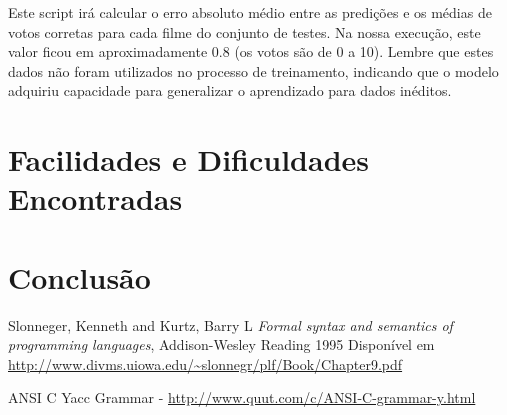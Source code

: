 \documentclass[12pt]{article}
\begin{document}
Este script irá calcular o erro absoluto médio entre as predições e os médias de votos corretas para cada filme do conjunto de testes. Na nossa execução, este valor ficou em aproximadamente 0.8 (os votos são de 0 a 10). Lembre que estes dados não foram utilizados no processo de treinamento, indicando que o modelo adquiriu capacidade para generalizar o aprendizado para dados inéditos.

\section{Facilidades e Dificuldades Encontradas}

\section{Conclusão}

\begin{thebibliography}{9}
  Slonneger, Kenneth and Kurtz, Barry L
  \textit{Formal syntax and semantics of programming languages},
  Addison-Wesley Reading
  1995
  Disponível em \url{http://www.divms.uiowa.edu/~slonnegr/plf/Book/Chapter9.pdf}

\item ANSI C Yacc Grammar - \url{http://www.quut.com/c/ANSI-C-grammar-y.html}
\end{thebibliography}
	
\end{document}
